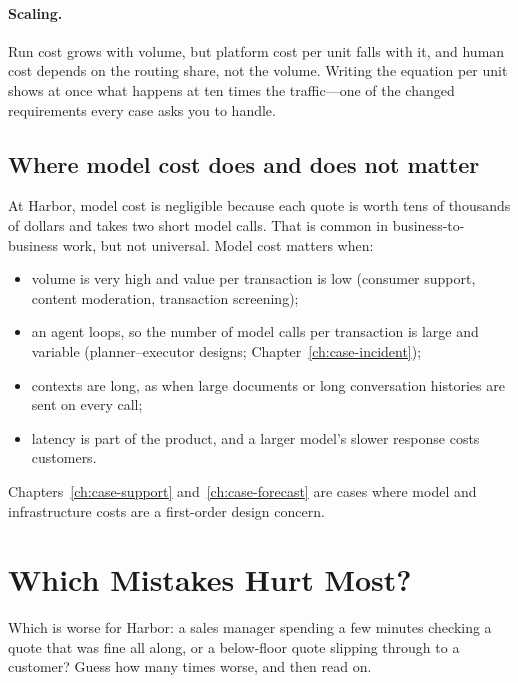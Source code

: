 \paragraph{Scaling.} Run cost grows with volume, but platform cost per unit falls with it, and human cost depends on the routing share, not the volume. Writing the equation per unit shows at once what happens at ten times the traffic---one of the changed requirements every case asks you to handle.

\subsection{Where model cost does and does not matter}

At Harbor, model cost is negligible because each quote is worth tens of thousands of dollars and takes two short model calls. That is common in business-to-business work, but not universal. Model cost matters when:
\begin{itemize}[itemsep=1pt]
  \item volume is very high and value per transaction is low (consumer support, content moderation, transaction screening);
  \item an agent loops, so the number of model calls per transaction is large and variable (planner--executor designs; Chapter~\ref{ch:case-incident});
  \item contexts are long, as when large documents or long conversation histories are sent on every call;
  \item latency is part of the product, and a larger model's slower response costs customers.
\end{itemize}
Chapters~\ref{ch:case-support} and~\ref{ch:case-forecast} are cases where model and infrastructure costs are a first-order design concern.

\section{Which Mistakes Hurt Most?}
\label{sec:error-cost}

\begin{thinkabout}
Which is worse for Harbor: a sales manager spending a few minutes checking a quote that was fine all along, or a below-floor quote slipping through to a customer? Guess how many times worse, and then read on.
\end{thinkabout}

